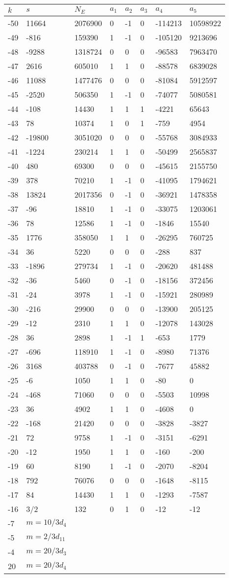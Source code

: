 \documentclass{amsart}
\begin{document}
\begin{longtable}{|l|l|l|lllll|}
\hline
$k$ & $s$ & $N_E$ & $a_1$ & $a_2$ & $a_3$ & $a_4$ & $a_5$\\
\hline
-50&11664&2076900&0&-1&0&-114213&10598922\\
-49&-816&159390&1&-1&0&-105120&9213696\\
-48&-9288&1318724&0&0&0&-96583&7963470\\
-47&2616&605010&1&1&0&-88578&6839028\\
-46&11088&1477476&0&0&0&-81084&5912597\\
-45&-2520&506350&1&-1&0&-74077&5080581\\
-44&-108&14430&1&1&1&-4221&65643\\
-43&78&10374&1&0&1&-759&4954\\
-42&-19800&3051020&0&0&0&-55768&3084933\\
-41&-1224&230214&1&1&0&-50499&2565837\\
-40&480&69300&0&0&0&-45615&2155750\\
-39&378&70210&1&-1&0&-41095&1794621\\
-38&13824&2017356&0&-1&0&-36921&1478358\\
-37&-96&18810&1&-1&0&-33075&1203061\\
-36&78&12586&1&-1&0&-1846&15540\\
-35&1776&358050&1&1&0&-26295&760725\\
-34&36&5220&0&0&0&-288&837\\
-33&-1896&279734&1&-1&0&-20620&481488\\
-32&-36&5460&0&-1&0&-18156&372456\\
-31&-24&3978&1&-1&0&-15921&280989\\
-30&-216&29900&0&0&0&-13900&205125\\
-29&-12&2310&1&1&0&-12078&143028\\
-28&36&2898&1&-1&1&-653&1779\\
-27&-696&118910&1&-1&0&-8980&71376\\
-26&3168&403788&0&-1&0&-7677&45882\\
-25&-6&1050&1&1&0&-80&0\\
-24&-468&71060&0&0&0&-5503&10998\\
-23&36&4902&1&1&0&-4608&0\\
-22&-168&21420&0&0&0&-3828&-3827\\
-21&72&9758&1&-1&0&-3151&-6291\\
-20&-12&1950&1&1&0&-160&-200\\
-19&60&8190&1&-1&0&-2070&-8204\\
-18&792&76076&0&0&0&-1648&-8115\\
-17&84&14430&1&1&0&-1293&-7587\\
-16&3/2&132&0&1&0&-12&-12\\
-7&$m=10/3d_{4}$&&\multicolumn{5}{c|}{}\\
-5&$m=2/3d_{11}$&&\multicolumn{5}{c|}{}\\
-4&$m=20/3d_{3}$&&\multicolumn{5}{c|}{}\\
20&$m=20/3d_{4}$&&\multicolumn{5}{c|}{}\\
\hline
\end{longtable}
\end{document}
